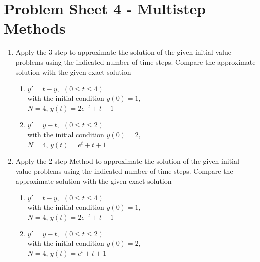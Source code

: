 \newpage
\section{Problem Sheet 4 - Multistep Methods}
\begin{enumerate}
\item
Apply the 3-step  to approximate the solution of the given initial value problems using the indicated number of time steps. Compare the approximate solution with the given exact solution
\begin{enumerate}
\item
$y'=t-y, \ \ (0\leq t \leq 4)$\\
with the initial condition $y(0)=1,$\\
$N=4$, 
$y(t)=2e^{-t}+t-1$\\

\item 
$y'=y-t, \ \ (0\leq t \leq 2)$\\
with the initial condition $y(0)=2,$\\
$N=4$, 
$y(t)=e^{t}+t+1$\\

\end{enumerate}
\item
Apply the 2-step  Method to approximate the solution of the given initial value problems using the indicated number of time steps. Compare the approximate solution with the given exact solution
\begin{enumerate}
\item
$y'=t-y, \ \ (0\leq t \leq 4)$\\
with the initial condition $y(0)=1,$\\
$N=4$, 
$y(t)=2e^{-t}+t-1$\\

\item 
$y'=y-t, \ \ (0\leq t \leq 2)$\\
with the initial condition $y(0)=2,$\\
$N=4$, 
$y(t)=e^{t}+t+1$\\


\end{enumerate}
\end{enumerate}
